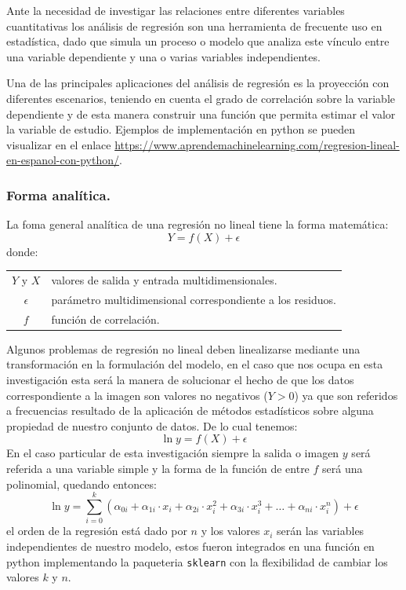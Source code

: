 Ante la necesidad de investigar las relaciones entre diferentes variables cuantitativas los análisis de regresión son una herramienta de frecuente uso en estadística, dado que simula un proceso o modelo que analiza este vínculo entre una variable dependiente y una o varias variables independientes. 

Una de las principales aplicaciones del análisis de regresión es la proyección con diferentes escenarios, teniendo en cuenta el grado de correlación sobre la variable dependiente y de esta manera construir una función que permita estimar el valor la variable de estudio. Ejemplos de implementación en python se pueden visualizar en el enlace \url{https://www.aprendemachinelearning.com/regresion-lineal-en-espanol-con-python/}.

\subsubsection{Forma analítica.}
La foma general analítica de una regresión no lineal tiene la forma matemática:
\begin{equation}
Y = f(X)+\epsilon
\end{equation}
donde:\\
\begin{tabular}{cp{14cm}}
$Y$ y $X$ & valores de salida y entrada multidimensionales.\\
$\epsilon$ & parámetro multidimensional correspondiente a los residuos.\\
$f$ & función de correlación.
\end{tabular}
Algunos problemas de regresión no lineal deben linealizarse mediante una transformación en la formulación del modelo, en el caso que nos ocupa en esta investigación esta será la manera de solucionar el hecho de que los datos correspondiente a la imagen son valores no negativos ($Y>0$) ya que son referidos a frecuencias resultado de la aplicación de métodos estadísticos sobre alguna propiedad de nuestro conjunto de datos. De lo cual tenemos:
\begin{equation}
\ln y = f(X)+\epsilon
\end{equation}
En el caso particular de esta investigación siempre la salida o imagen $y$ será referida a una variable simple y la forma de la función de entre $f$ será una polinomial, quedando entonces:
\begin{equation}\label{regresion}
\ln y = \sum_{i=0}^k (\alpha_{0i} + \alpha_{1i}\cdot x_i + \alpha_{2i}\cdot x_i^2 + \alpha_{3i}\cdot x_i^3 + \ldots+\alpha_{ni} \cdot x_i^n)+\epsilon
\end{equation}
el orden de la regresión está dado por $n$ y los valores $x_i$ serán las variables independientes de nuestro modelo, estos fueron integrados en una función en python implementando la paqueteria \texttt{sklearn} con la flexibilidad de cambiar los valores $k$ y $n$. %


